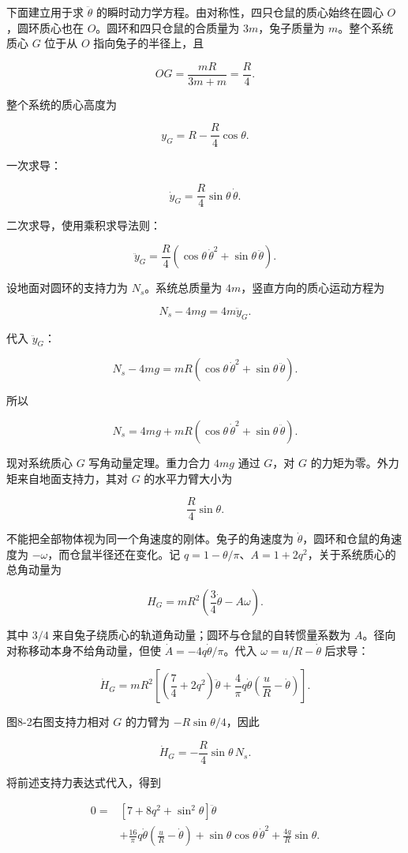 \documentclass[12pt,a4paper,UTF8]{ctexart}
\begin{document}
下面建立用于求 \(\ddot\theta\)
的瞬时动力学方程。由对称性，四只仓鼠的质心始终在圆心 \(O\)，圆环质心也在
\(O\)。圆环和四只仓鼠的合质量为 \(3m\)，兔子质量为 \(m\)。整个系统质心
\(G\) 位于从 \(O\) 指向兔子的半径上，且

\[OG=\frac{mR}{3m+m}=\frac R4.\]

整个系统的质心高度为

\[y_G=R-\frac R4\cos\theta.\]

一次求导：

\[\dot y_G=\frac R4\sin\theta\,\dot\theta.\]

二次求导，使用乘积求导法则：

\[\ddot y_G=\frac R4
\left(\cos\theta\,\dot\theta^2+\sin\theta\,\ddot\theta\right).\]

设地面对圆环的支持力为 \(N_s\)。系统总质量为
\(4m\)，竖直方向的质心运动方程为

\[N_s-4mg=4m\ddot y_G.\]

代入 \(\ddot y_G\)：

\[N_s-4mg
=mR\left(\cos\theta\,\dot\theta^2+\sin\theta\,\ddot\theta\right).\]

所以

\[N_s=4mg+mR
\left(\cos\theta\,\dot\theta^2+\sin\theta\,\ddot\theta\right).\]

现对系统质心 \(G\) 写角动量定理。重力合力 \(4mg\) 通过 \(G\)，对 \(G\)
的力矩为零。外力矩来自地面支持力，其对 \(G\) 的水平力臂大小为

\[\frac R4\sin\theta.\]

不能把全部物体视为同一个角速度的刚体。兔子的角速度为
\(\dot\theta\)，圆环和仓鼠的角速度为 \(-\omega\)，而仓鼠半径还在变化。记
\(q=1-\theta/\pi\)、\(A=1+2q^2\)，关于系统质心的总角动量为

\[H_G=mR^2\left(\frac34\dot\theta-A\omega\right).\]

其中 \(3/4\) 来自兔子绕质心的轨道角动量；圆环与仓鼠的自转惯量系数为
\(A\)。径向对称移动本身不给角动量，但使
\(\dot A=-4q\dot\theta/\pi\)。代入 \(\omega=u/R-\dot\theta\) 后求导：

\[\dot H_G=mR^2\left[
\left(\frac74+2q^2\right)\ddot\theta
+\frac4\pi q\dot\theta\left(\frac uR-\dot\theta\right)\right].\]

图8-2右图支持力相对 \(G\) 的力臂为 \(-R\sin\theta/4\)，因此

\[\dot H_G=-\frac R4\sin\theta\,N_s.\]

将前述支持力表达式代入，得到

\[\begin{aligned}
0={}&\left[7+8q^2+\sin^2\theta\right]\ddot\theta\\
&+\frac{16}\pi q\dot\theta\left(\frac uR-\dot\theta\right)
+\sin\theta\cos\theta\,\dot\theta^2
+\frac{4g}R\sin\theta.
\end{aligned}\]
\end{document}
